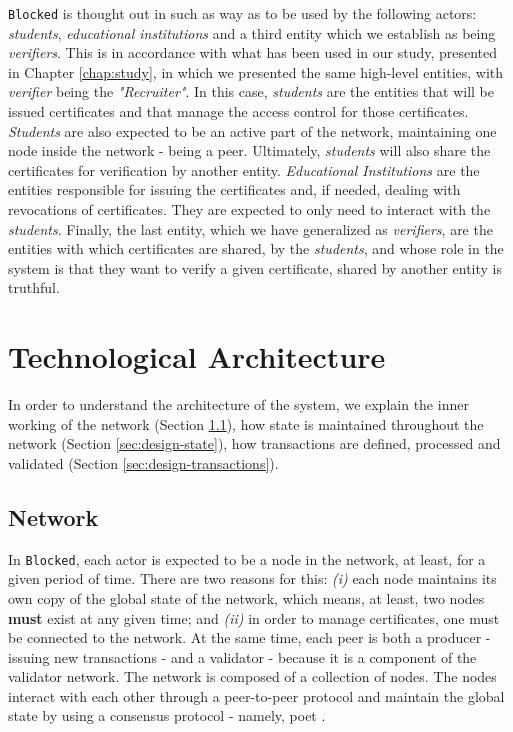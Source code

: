 \texttt{Blocked} is thought out in such as way as to be used by the following actors: \textit{students}, \textit{educational institutions} and a third entity which we establish as being \textit{verifiers}. This is in accordance with what has been used in our study, presented in Chapter \ref{chap:study}, in which we presented the same high-level entities, with \textit{verifier} being the \textit{"Recruiter"}. In this case, \textit{students} are the entities that will be issued certificates and that manage the access control for those certificates. \textit{Students} are also expected to be an active part of the network, maintaining one node inside the network - being a peer. Ultimately, \textit{students} will also share the certificates for verification by another entity. \textit{Educational Institutions} are the entities responsible for issuing the certificates and, if needed, dealing with revocations of certificates. They are expected to only need to interact with the \textit{students}. Finally, the last entity, which we have generalized as \textit{verifiers}, are the entities with which certificates are shared, by the \textit{students}, and whose role in the system is that they want to verify a given certificate, shared by another entity is truthful.


\section{Technological Architecture}
\label{sec:design-architecture}

In order to understand the architecture of the system, we explain the inner working of the network (Section \ref{sec:design-network}), how state is maintained throughout the network (Section \ref{sec:design-state}), how transactions are defined, processed and validated (Section \ref{sec:design-transactions}).

\subsection{Network}
\label{sec:design-network}

In \texttt{Blocked}, each actor is expected to be a node in the network, at least, for a given period of time. There are two reasons for this: \emph{(i)} each node maintains its own copy of the global state of the network, which means, at least, two nodes \textbf{must} exist at any given time; and \emph{(ii)} in order to manage certificates, one must be connected to the network. At the same time, each peer is both a producer - issuing new transactions - and a validator - because it is a component of the validator network. The network is composed of a collection of nodes. The nodes interact with each other through a peer-to-peer protocol and maintain the global state by using a consensus protocol - namely, \gls{poet} \cite{intel_poet}.

